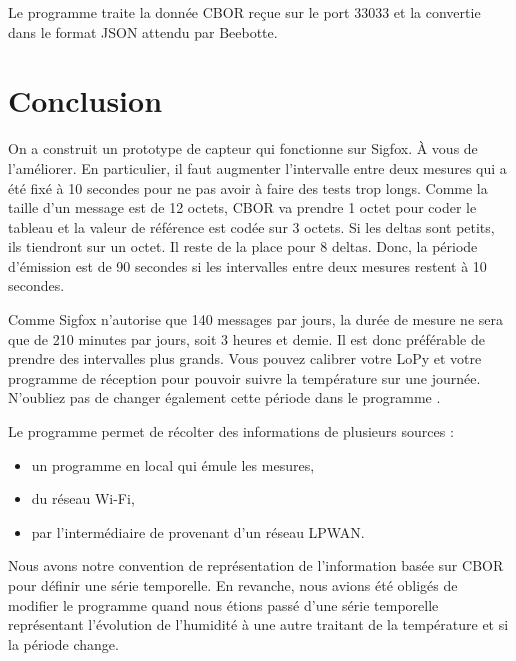 Le programme  traite la donnée CBOR reçue sur le port 33033 et la convertie dans le format JSON attendu par Beebotte.

\section{Conclusion}

On a construit un prototype de capteur qui fonctionne sur Sigfox. À vous de l’améliorer. En particulier, il faut augmenter l’intervalle entre deux mesures qui a été fixé à 10 secondes pour ne pas avoir à faire des tests trop longs. Comme la taille d’un message est de 12 octets, CBOR va prendre 1 octet pour coder le tableau et la valeur de référence est codée sur 3 octets. Si les deltas sont petits, ils tiendront sur un octet. Il reste de la place pour 8 deltas. Donc, la période d’émission est de 90 secondes si les intervalles entre deux mesures restent à 10 secondes.

Comme Sigfox n'autorise que 140 messages par jours, la durée de mesure ne sera que de 210 minutes par jours, soit 3 heures et demie. Il est donc préférable de prendre des intervalles plus grands. Vous pouvez calibrer votre LoPy et votre programme de réception pour pouvoir suivre la température sur une journée. N'oubliez pas de changer également cette période dans le programme  .

      \vspace{1em}


Le programme  permet de récolter des informations de plusieurs sources :
\begin{itemize}
    \item un programme en local qui émule les mesures,
    \item du réseau Wi-Fi,
    \item par l'intermédiaire de  provenant d'un réseau LPWAN.
\end{itemize} 

      \vspace{1em}


Nous avons notre convention de représentation de l'information basée sur CBOR pour définir une série temporelle. En revanche, nous avions été obligés de modifier le programme   quand nous étions passé d'une série temporelle représentant l'évolution de l'humidité à une autre traitant de la température et si la période change.

